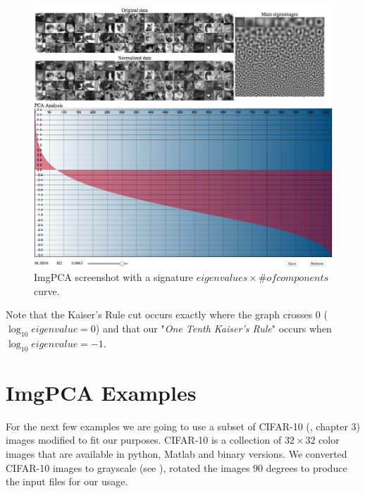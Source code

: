 \documentclass{article} %
\begin{document}

\begin{figure}[h]
\begin{center}
\includegraphics[width=\textwidth]{imgPca.png}
\end{center}
\caption{ImgPCA screenshot with a signature $eigenvalues \times \#of components$ curve.}
\end{figure}
Note that the Kaiser's Rule cut occurs exactly where the graph crosses $0$ ($\log_{10} eigenvalue = 0$) and that our "\emph{One Tenth Kaiser's Rule}" occurs when $\log_{10} eigenvalue = -1$.
\section{ImgPCA Examples}

For the next few examples we are going to use a subset of CIFAR-10 (\citet{krizhevsky2009learning}, chapter 3) images modified to fit our purposes. CIFAR-10 is a collection of $32\times 32$ color images that are available in python, Matlab and binary versions. We converted CIFAR-10 images to grayscale (see ), rotated the images $90$ degrees to produce the input files for our usage.\par
\end{document}

